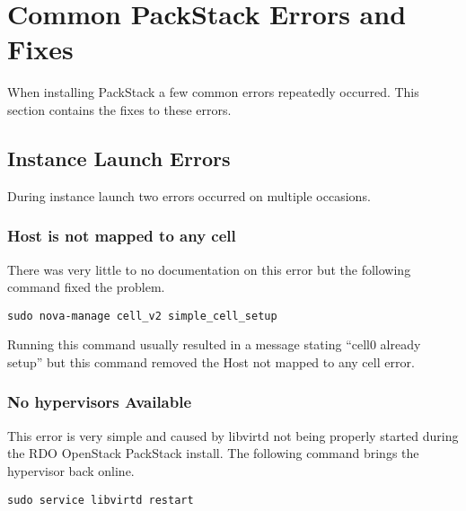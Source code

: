 \section{Common PackStack Errors and Fixes}
\label{app:errors}

When installing PackStack a few common errors repeatedly occurred. This
section contains the fixes to these errors.

\subsection{Instance Launch Errors}

During instance launch two errors occurred on multiple occasions.

\subsubsection{Host is not mapped to any cell}

There was very little to no documentation on this error but the
following command fixed the problem.

\begin{lstlisting}[escapechar=&]
sudo nova-manage cell_v2 simple_cell_setup
\end{lstlisting}

Running this command usually resulted in a message stating ``cell0
already setup'' but this command removed the Host not mapped to any cell
error.

\subsubsection{No hypervisors Available}

This error is very simple and caused by libvirtd not being properly
started during the RDO OpenStack PackStack install. The following
command brings the hypervisor back online.

\begin{lstlisting}[escapechar=&]
sudo service libvirtd restart
\end{lstlisting}
